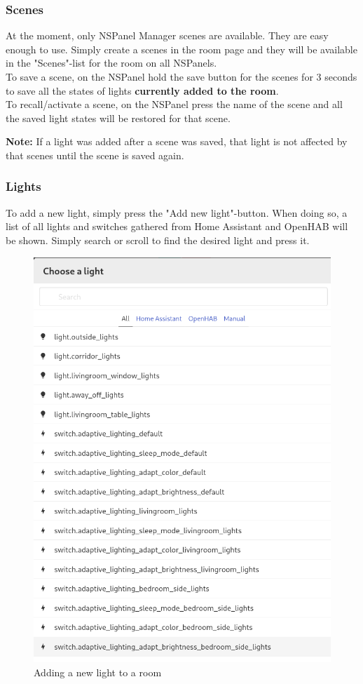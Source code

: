 \documentclass[10pt]{article}
\newcommand{\note}[1]{\begin{noteBox} \textbf{Note:} #1 \end{noteBox}}
\begin{document}
    \subsubsection{Scenes}
    At the moment, only NSPanel Manager scenes are available. They are easy enough to use. Simply create a scenes in the room page and they will be available in the "Scenes"-list for the room on all NSPanels.
    \\ To save a scene, on the NSPanel hold the save button for the scenes for 3 seconds to save all the states of lights \textbf{currently added to the room}.
    \\ To recall/activate a scene, on the NSPanel press the name of the scene and all the saved light states will be restored for that scene.
    \note{If a light was added after a scene was saved, that light is not affected by that scenes until the scene is saved again.}
    \subsubsection{Lights}
    To add a new light, simply press the "Add new light"-button. When doing so, a list of all lights and switches gathered from Home Assistant and OpenHAB will be shown. Simply search or scroll to find the desired light and press it.
    \begin{figure}[H]
    \centering
    \includegraphics[scale=0.25]{add_new_light.png}
    \caption{Adding a new light to a room}%
    \end{figure}
    
\end{document}
